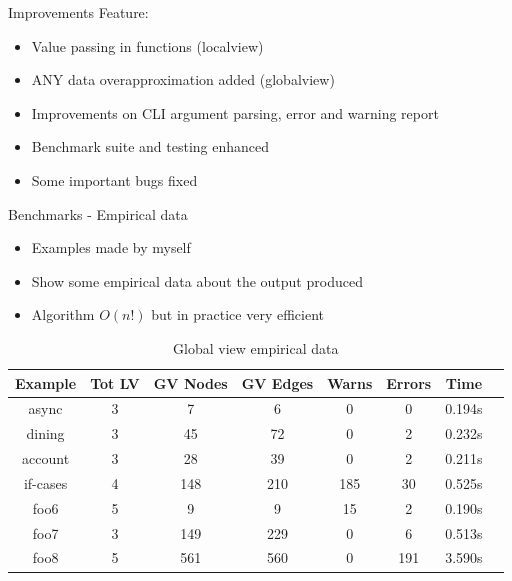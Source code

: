 \documentclass{beamer}
\begin{document}
\begin{frame}{Improvements}
Feature:
\begin{itemize}
    \item Value passing in functions (localview)
    \bigskip
    \item ANY data overapproximation added (globalview)
    \bigskip
    \item Improvements on CLI argument parsing, error and warning report
    \bigskip
    \item Benchmark suite and testing enhanced 
    \bigskip
    \item Some important bugs fixed
\end{itemize}
\end{frame}


\begin{frame}{Benchmarks - Empirical data}
\begin{itemize}
    \item Examples made by myself
    \item Show some empirical data about the output produced
    \item Algorithm $O(n!)$ but in practice very efficient 
\end{itemize}

\begin{table}[!ht]
\centering
\begin{tabular}{|c|c|c|c|c|c|c|c|}
\hline
Example & Tot LV & GV Nodes & GV Edges & Warns & Errors & Time \\ 
\hline
async & 3 & 7 & 6 & 0 & 0 & 0.194s \\ 
dining & 3 & 45 & 72 & 0 & 2 & 0.232s \\ 
account & 3 & 28 & 39 & 0 & 2 & 0.211s \\ 
if-cases & 4 & 148 & 210 & 185 & 30 & 0.525s \\ 
foo6 & 5 & 9 & 9 & 15 & 2 & 0.190s \\ 
foo7 & 3 & 149 & 229 & 0 & 6 & 0.513s \\ 
foo8 & 5 & 561 & 560 & 0 & 191 & 3.590s \\ 
\hline
\end{tabular}
\caption{Global view empirical data}
\label{tab:gvbench}
\end{table}
\end{frame}
\end{document}
